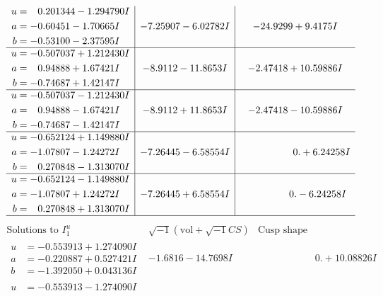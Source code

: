 \documentclass[1p]{elsarticle_modified}
\theoremstyle{definition}
\newcommand{\I}{\sqrt{-1}}
\begin{document}
$$\begin{array}{c|c|c}
\begin{aligned}
u &= \phantom{-}0.201344 - 1.294790 I \\
a &= -0.60451 - 1.70665 I \\
b &= -0.53100 - 2.37595 I\end{aligned}
 & -7.25907 - 6.02782 I & -24.9299 + 9.4175 I \\ \hline\begin{aligned}
u &= -0.507037 + 1.212430 I \\
a &= \phantom{-}0.94888 + 1.67421 I \\
b &= -0.74687 + 1.42147 I\end{aligned}
 & -8.9112 - 11.8653 I & -2.47418 + 10.59886 I \\ \hline\begin{aligned}
u &= -0.507037 - 1.212430 I \\
a &= \phantom{-}0.94888 - 1.67421 I \\
b &= -0.74687 - 1.42147 I\end{aligned}
 & -8.9112 + 11.8653 I & -2.47418 - 10.59886 I \\ \hline\begin{aligned}
u &= -0.652124 + 1.149880 I \\
a &= -1.07807 - 1.24272 I \\
b &= \phantom{-}0.270848 - 1.313070 I\end{aligned}
 & -7.26445 - 6.58554 I & \phantom{-0.000000 -}0. + 6.24258 I \\ \hline\begin{aligned}
u &= -0.652124 - 1.149880 I \\
a &= -1.07807 + 1.24272 I \\
b &= \phantom{-}0.270848 + 1.313070 I\end{aligned}
 & -7.26445 + 6.58554 I & \phantom{-0.000000 } 0. - 6.24258 I\\
 \hline 
 \end{array}$$\newpage$$\begin{array}{c|c|c}  
\text{Solutions to }I^u_{1}& \I (\text{vol} + \sqrt{-1}CS) & \text{Cusp shape}\\
 \hline 
\begin{aligned}
u &= -0.553913 + 1.274090 I \\
a &= -0.220887 + 0.527421 I \\
b &= -1.392050 + 0.043136 I\end{aligned}
 & -1.6816 - 14.7698 I & \phantom{-0.000000 -}0. + 10.08826 I \\ \hline\begin{aligned}
u &= -0.553913 - 1.274090 I \\

\end{aligned}
\end{array}$$
\end{document}
